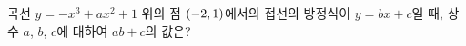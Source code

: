 곡선 $y=-x^3+ax^2+1$ 위의 점 $(-2{,}\mkern3mu\mathopen{}1)$에서의 접선의 방정식이 $y=bx+c$일 때, 상수 $a$, $b$, $c$에 대하여 $ab+c$의 값은?
